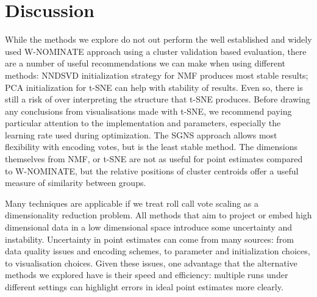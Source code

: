 \documentclass{llncs}
\begin{document}

\section{Discussion}
While the methods we explore do not out perform the well established and widely used W-NOMINATE approach using a cluster validation based evaluation, there are a number of useful recommendations we can make when using different methods: NNDSVD initialization strategy for NMF produces most stable results; PCA initialization for t-SNE can help with stability of results. Even so, there is still a risk of over interpreting the structure that t-SNE produces. Before drawing any conclusions from visualisations made with t-SNE, we recommend paying particular attention to the implementation and parameters, especially the learning rate used during optimization. The SGNS approach allows most flexibility with encoding votes, but is the least stable method. The dimensions themselves from NMF, or t-SNE are not as useful for point estimates compared to W-NOMINATE, but the relative positions of cluster centroids offer a useful measure of similarity between groups.

Many techniques are applicable if we treat roll call vote scaling as a dimensionality reduction problem. All methods that aim to project or embed high dimensional data in a low dimensional space introduce some uncertainty and instability. Uncertainty in point estimates can come from many sources: from data quality issues and encoding schemes, to parameter and initialization choices, to visualisation choices. Given these issues, one advantage that the alternative methods we explored have is their speed and efficiency: multiple runs under different settings can highlight errors in ideal point estimates more clearly.
\end{document}

